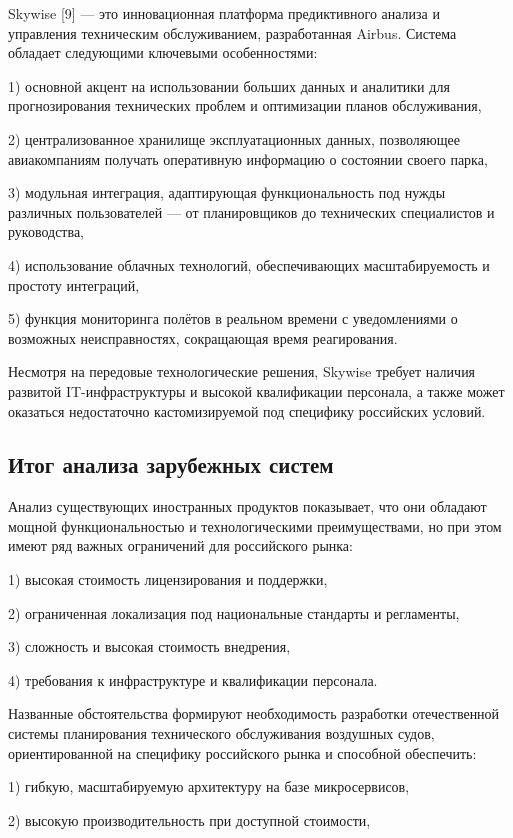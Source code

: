 \documentclass[14pt,a4paper]{extarticle}
\begin{document}
Skywise [9] — это инновационная платформа предиктивного анализа и управления техническим обслуживанием, разработанная Airbus. Система обладает следующими ключевыми особенностями: 

1) основной акцент на использовании больших данных и аналитики для прогнозирования технических проблем и оптимизации планов обслуживания,

2) централизованное хранилище эксплуатационных данных, позволяющее авиакомпаниям получать оперативную информацию о состоянии своего парка,

3) модульная интеграция, адаптирующая функциональность под нужды различных пользователей — от планировщиков до технических специалистов и руководства,

4) использование облачных технологий, обеспечивающих масштабируемость и простоту интеграций,

5) функция мониторинга полётов в реальном времени с уведомлениями о возможных неисправностях, сокращающая время реагирования.

Несмотря на передовые технологические решения, Skywise требует наличия развитой IT-инфраструктуры и высокой квалификации персонала, а также может оказаться недостаточно кастомизируемой под специфику российских условий.

\subsection{Итог анализа зарубежных систем}

Анализ существующих иностранных продуктов показывает, что они обладают мощной функциональностью и технологическими преимуществами, но при этом имеют ряд важных ограничений для российского рынка:

1) высокая стоимость лицензирования и поддержки,

2) ограниченная локализация под национальные стандарты и регламенты,

3) сложность и высокая стоимость внедрения,

4) требования к инфраструктуре и квалификации персонала.

Названные обстоятельства формируют необходимость разработки отечественной системы планирования технического обслуживания воздушных судов, ориентированной на специфику российского рынка и способной обеспечить:

1) гибкую, масштабируемую архитектуру на базе микросервисов,

2) высокую производительность при доступной стоимости,
\end{document}
